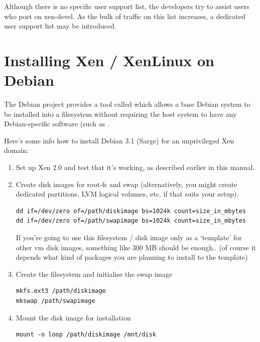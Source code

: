 \documentclass[11pt,twoside,final,openright]{report}
\begin{document}
{Although there is no specific user support list, the developers try to
assist users who post on xen-devel.  As the bulk of traffic on this
list increases, a dedicated user support list may be introduced.

\appendix


\chapter{Installing Xen / XenLinux on Debian}

The Debian project provides a tool called  which
allows a base Debian system to be installed into a filesystem without
requiring the host system to have any Debian-specific software (such
as . 

Here's some info how to install Debian 3.1 (Sarge) for an unprivileged
Xen domain:

\begin{enumerate}
\item Set up Xen 2.0 and test that it's working, as described earlier in
      this manual.

\item Create disk images for root-fs and swap (alternatively, you
      might create dedicated partitions, LVM logical volumes, etc. if
      that suits your setup).
\begin{small}\begin{verbatim}  
dd if=/dev/zero of=/path/diskimage bs=1024k count=size_in_mbytes
dd if=/dev/zero of=/path/swapimage bs=1024k count=size_in_mbytes
\end{verbatim}\end{small}
      If you're going to use this filesystem / disk image only as a
      `template' for other vm disk images, something like 300 MB should
      be enough.. (of course it depends what kind of packages you are
      planning to install to the template)

\item Create the filesystem and initialise the swap image
\begin{small}\begin{verbatim}
mkfs.ext3 /path/diskimage
mkswap /path/swapimage
\end{verbatim}\end{small}

\item Mount the disk image for installation
\begin{small}\begin{verbatim}
mount -o loop /path/diskimage /mnt/disk
\end{verbatim}\end{small}


\end{enumerate}}
\end{document}
